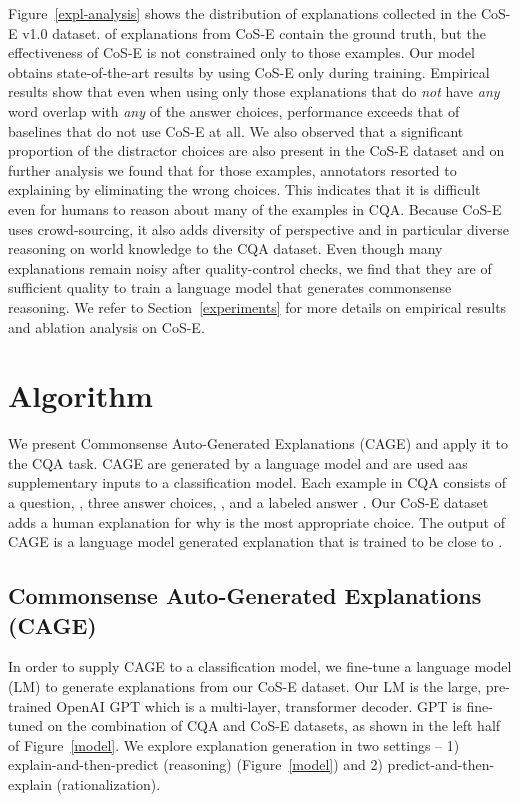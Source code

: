 \documentclass[11pt,a4paper]{article}
\begin{document}
 



 
Figure~\ref{expl-analysis} shows the distribution of explanations collected in the CoS-E v1.0 dataset. 
 of explanations from CoS-E contain the ground truth, but the effectiveness of CoS-E is not constrained only to those examples.
Our model obtains state-of-the-art results by using CoS-E only during training.
Empirical results show that even when using only those explanations that do {\it not} have {\it any} word overlap with {\it any} of the answer choices,
performance exceeds that of baselines that do not use CoS-E at all.
We also observed that a significant proportion of the
distractor choices are also present in the CoS-E
dataset and on further analysis we found that for
those examples, annotators resorted to explaining
by eliminating the wrong choices. This indicates
that it is difficult even for humans to reason about
many of the examples in CQA. Because CoS-E uses crowd-sourcing, it also adds diversity
of perspective and in particular diverse reasoning
on world knowledge to the CQA
dataset.
Even though many explanations remain noisy after quality-control checks, 
we find that they are of sufficient quality to train a language model that generates commonsense reasoning. 
We refer to Section~\ref{experiments} for more details on empirical results and ablation analysis on CoS-E. 

 \section{Algorithm}
\vspace{-0.2cm}
We present Commonsense Auto-Generated Explanations (CAGE) and apply it to the CQA task. 
CAGE are generated by a language model and are used aas supplementary inputs to a classification model. 
Each example in CQA consists of a question, , three answer choices, , and a labeled answer . Our CoS-E dataset adds a human explanation  for why  is the most appropriate choice. 
The output of CAGE is a language model generated explanation  that is trained to be close to .

\subsection{Commonsense Auto-Generated Explanations (CAGE)}\label{sec:generating}
\vspace{-0.2cm}
In order to supply CAGE to a classification model, we fine-tune a language model (LM) to generate explanations from our CoS-E dataset.
Our LM is the large, pre-trained OpenAI GPT \citep{radford2018improving} which is a multi-layer, transformer \citep{vaswani2017attention} decoder. 
GPT is fine-tuned on the combination of CQA and CoS-E datasets, as shown in the left half of Figure~\ref{model}.
We explore explanation generation in two settings -- 1) explain-and-then-predict (reasoning) (Figure~\ref{model}) and 2) predict-and-then-explain (rationalization).
\end{document}
